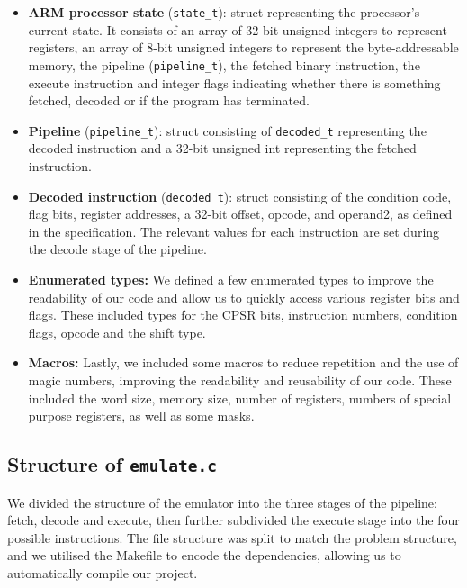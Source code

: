 \documentclass[11pt]{article}
\begin{document}
\begin{itemize}

\item \textbf{ARM processor state} (\texttt{state\_t}): struct representing the processor's current state. It consists of an array of 32-bit unsigned integers to represent registers, an array of 8-bit unsigned integers to represent the byte-addressable memory, the pipeline (\texttt{pipeline\_t}), the fetched binary instruction, the execute instruction and integer flags indicating whether there is something fetched, decoded or if the program has terminated.

\item \textbf{Pipeline} (\texttt{pipeline\_t}): struct consisting of \texttt{decoded\_t} representing the decoded instruction and a 32-bit unsigned int representing the fetched instruction.

\item \textbf{Decoded instruction} (\texttt{decoded\_t}): struct consisting of the condition code, flag bits, register addresses, a 32-bit offset, opcode, and operand2, as defined in the specification. The relevant values for each instruction are set during the decode stage of the pipeline.

\item \textbf{Enumerated types:} We defined a few enumerated types to improve the readability of our code and allow us to quickly access various register bits and flags. These included types for the CPSR bits, instruction numbers, condition flags, opcode and the shift type.

\item \textbf{Macros:} Lastly, we included some macros to reduce repetition and the use of magic numbers, improving the readability and reusability of our code. These included the word size, memory size, number of registers, numbers of special purpose registers, as well as some masks.

\end{itemize}

\subsection{Structure of \texttt{emulate.c}}

We divided the structure of the emulator into the three stages of the pipeline: fetch, decode and execute, then further subdivided the execute stage into the four possible instructions. The file structure was split to match the problem structure, and we utilised the Makefile to encode the dependencies, allowing us to automatically compile our project.
\end{document}
